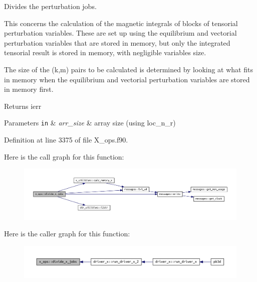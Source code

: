 Divides the perturbation jobs. 

This concerns the calculation of the magnetic integrals of blocks of tensorial perturbation variables. These are set up using the equilibrium and vectorial perturbation variables that are stored in memory, but only the integrated tensorial result is stored in memory, with negligible variables size.

The size of the (k,m) pairs to be calculated is determined by looking at what fits in memory when the equilibrium and vectorial perturbation variables are stored in memory first.

\begin{DoxyReturn}{Returns}
ierr
\end{DoxyReturn}

\begin{DoxyParams}[1]{Parameters}
\mbox{\tt in}  & {\em arr\+\_\+size} & array size (using loc\+\_\+n\+\_\+r) \\
\hline
\end{DoxyParams}


Definition at line 3375 of file X\+\_\+ops.\+f90.

Here is the call graph for this function\+:\nopagebreak
\begin{figure}[H]
\begin{center}
\leavevmode
\includegraphics[width=350pt]{namespacex__ops_a677c88d85fe1bfbf3579a2421ce16f2f_cgraph}
\end{center}
\end{figure}
Here is the caller graph for this function\+:\nopagebreak
\begin{figure}[H]
\begin{center}
\leavevmode
\includegraphics[width=350pt]{namespacex__ops_a677c88d85fe1bfbf3579a2421ce16f2f_icgraph}
\end{center}
\end{figure}
\mbox{\label{namespacex__ops_a73a80c582379669f8e07b09dd7456878}} 

